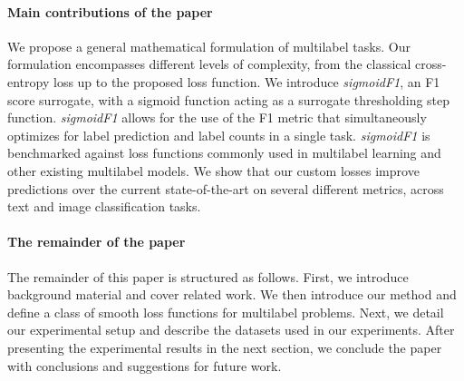 \paragraph{Main contributions of the paper}
We propose a general mathematical formulation of multilabel tasks.
Our formulation encompasses different levels of complexity, from the classical cross-entropy loss up to the proposed loss function. We introduce \emph{sigmoidF1}, an F1 score surrogate, with a sigmoid function acting as a surrogate thresholding step function.
\emph{sigmoidF1} allows for the use of the F1 metric that simultaneously optimizes for label prediction and label counts in a single task.
\emph{sigmoidF1} is benchmarked against loss functions commonly used in multilabel learning and other existing multilabel models. We show that our custom losses improve predictions over the current state-of-the-art on several different metrics, across text and image classification tasks.

\paragraph{The remainder of the paper}
The remainder of this paper is structured as follows. First, we introduce background material and cover related work. We then introduce our method and define a class of smooth loss functions for multilabel problems. Next, we detail our experimental setup and describe the datasets used in our experiments. After presenting the experimental results in the next section, we conclude the paper with conclusions and suggestions for future work.





